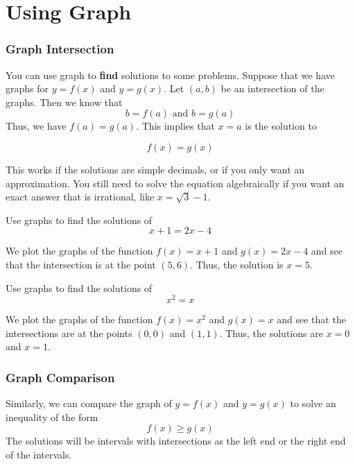 \section{Using Graph}
\frame{\sectionpage}

\begin{frame}
\frametitle{Graph Intersection}
You can use graph to \textbf{find} solutions to some problems. Suppose that we have graphs for $y = f(x)$ and $y = g(x)$. Let $(a,b)$ be an intersection of the graphs. Then we know that
\[ b = f(a) \text{ and } b = g(a) \]
Thus, we have $f(a) = g(a)$. This implies that $x=a$ is the solution to
\begin{block}{}
\[f(x) = g(x)\]
\end{block}
This works if the solutions are simple decimals, or if you only want an approximation. You still need to solve the equation algebraically if you want an exact answer that is irrational, like $x = \sqrt{3}-1$.
\end{frame}



\begin{frame}[t]
\begin{ex}
Use graphs to find the solutions of
\[ x+1 = 2x-4\]
\end{ex}
\begin{sol}
We plot the graphs of the function $f(x) = x+1$ and $g(x) = 2x-4$ and see that the intersection is at the point $(5,6)$. Thus, the solution is $x = 5$.
\end{sol}
\end{frame}


\begin{frame}[t]
\begin{ex}
Use graphs to find the solutions of
\[ x^2 = x\]
\end{ex}

\begin{sol}
We plot the graphs of the function $f(x) = x^2$ and $g(x) = x$ and see that the intersections are at the points $(0,0)$ and $(1,1)$. Thus, the solutions are $x = 0$ and $x=1$.
\end{sol}
\end{frame}

\begin{frame}
\frametitle{Graph Comparison}
Similarly, we can compare the graph of $y = f(x)$ and $y = g(x)$ to solve an inequality of the form
\[ f(x) \geq g(x)\]
The solutions will be intervals with intersections as the left end or the right end of the intervals.
\end{frame}


